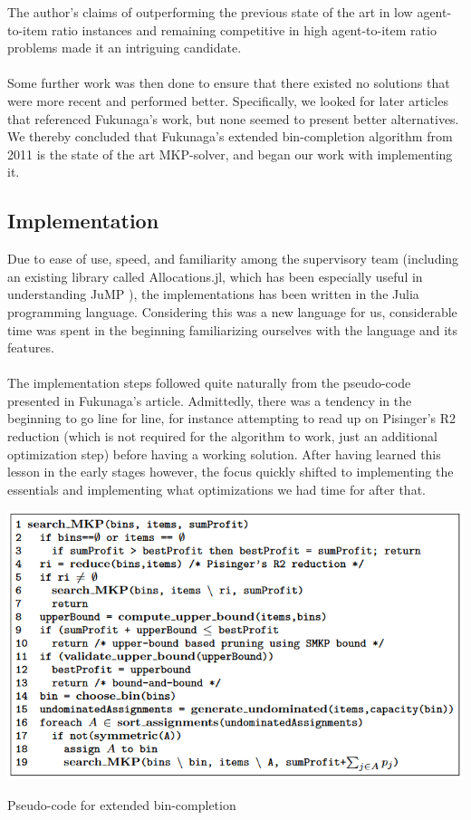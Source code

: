 \documentclass[b5paper]{article}
\begin{document}
The author's claims of outperforming the previous state of the art in low agent-to-item ratio instances and remaining competitive in high agent-to-item ratio problems made it an intriguing candidate.
\\ \\
Some further work was then done to ensure that there existed no solutions that were more recent and performed better. 
Specifically, we looked for later articles that referenced Fukunaga's work, but none seemed to present better alternatives.
We thereby concluded that Fukunaga's extended bin-completion algorithm from 2011 is the state of the art MKP-solver, and began our work with implementing it.

\subsection{Implementation}
Due to ease of use, speed, and familiarity among the supervisory team (including an existing library called Allocations.jl, which has been especially useful in understanding JuMP \cite{hetland_mlhetlandallocationsjl_nodate}), the implementations has been written in the Julia programming language.
Considering this was a new language for us, considerable time was spent in the beginning familiarizing ourselves with the language and its features. 
\\ \\
The implementation steps followed quite naturally from the pseudo-code presented in Fukunaga's article. 
Admittedly, there was a tendency in the beginning to go line for line, for instance attempting to read up on Pisinger's R2 reduction 
(which is not required for the algorithm to work, just an additional optimization step) before having a working solution.
After having learned this lesson in the early stages however, the focus quickly shifted to implementing the essentials and implementing what optimizations we had time for after that.
\\
\begin{algorithm}

    \centering
    \includegraphics[width=1\textwidth]{psuedo_code.PNG}
    \caption{Pseudo-code for extended bin-completion \cite{fukunaga_branch-and-bound_2011}}

\end{algorithm}
\end{document}
